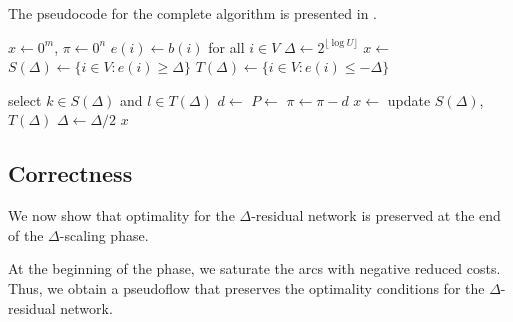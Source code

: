 The pseudocode for the complete algorithm is presented in .

\begin{algorithm}[H]
        \caption{\textsc{CapacityScalingAlgorithm}$(G, b, c, u)$}
        \label{alg:capacity_scaling}
    \begin{algorithmic}[1]
        \State $x \gets 0^m$, $\pi \gets 0^n$
        \State $e(i) \gets b(i)$ for all $i \in V$
        \State $\Delta \gets 2^{\lfloor \log U \rfloor}$
         
             
                \State $x \gets$  
            \EndIf 
            \EndFor
            \State $S(\Delta) \gets \{i\in V \colon e(i) \geq \Delta\}$
            \State $T(\Delta) \gets \{i\in V \colon e(i) \leq -\Delta\}$

                \State select $k \in S(\Delta)$ and $l\in T(\Delta)$ 
                \State $d \gets$  
                \State $P \gets$    
                \State $\pi \gets \pi -d$
                \State $x \gets$  
                \State update $S(\Delta)$, $T(\Delta)$
            \EndWhile
            \State $\Delta \gets \Delta/2$
        \EndWhile
        \State \Return $x$
    \end{algorithmic}
\end{algorithm}


\subsection{Correctness}

We now show that optimality for the $\Delta$-residual network is preserved at the end of the $\Delta$-scaling phase.

At the beginning of the phase, we saturate the arcs with negative reduced costs. Thus, we obtain a pseudoflow that preserves the optimality conditions for the $\Delta$-residual network.

